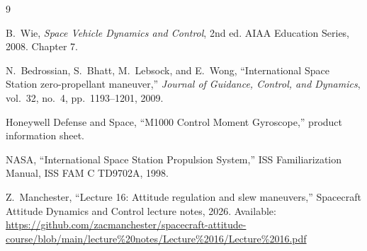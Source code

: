 \documentclass[conference]{IEEEtran}
\begin{document}
\begin{thebibliography}{9}

B.~Wie,
\textit{Space Vehicle Dynamics and Control}, 2nd ed.
AIAA Education Series, 2008. Chapter 7.

N.~Bedrossian, S.~Bhatt, M.~Lebsock, and E.~Wong,
``International Space Station zero-propellant maneuver,''
\textit{Journal of Guidance, Control, and Dynamics},
vol.~32, no.~4, pp.~1193--1201, 2009.

Honeywell Defense and Space,
``M1000 Control Moment Gyroscope,'' product information sheet.

NASA, ``International Space Station Propulsion System,''
ISS Familiarization Manual, ISS FAM C TD9702A, 1998.

Z.~Manchester,
``Lecture 16: Attitude regulation and slew maneuvers,''
Spacecraft Attitude Dynamics and Control lecture notes, 2026.
Available: \url{https://github.com/zacmanchester/spacecraft-attitude-course/blob/main/lecture%20notes/Lecture%2016/Lecture%2016.pdf}

\end{thebibliography}
\end{document}
